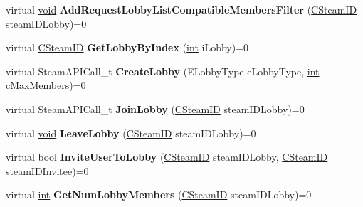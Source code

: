 \begin{DoxyCompactItemize}
\item 
\hypertarget{classISteamMatchmaking_aa2bcffc943566ee3c03b593cca4e0a22}{}virtual \hyperlink{SDL__audio_8h_a52835ae37c4bb905b903cbaf5d04b05f}{void} {\bfseries Add\+Request\+Lobby\+List\+Compatible\+Members\+Filter} (\hyperlink{classCSteamID}{C\+Steam\+I\+D} steam\+I\+D\+Lobby)=0\label{classISteamMatchmaking_aa2bcffc943566ee3c03b593cca4e0a22}

\item 
\hypertarget{classISteamMatchmaking_ae22f461db3ff301594791b0171ed3631}{}virtual \hyperlink{classCSteamID}{C\+Steam\+I\+D} {\bfseries Get\+Lobby\+By\+Index} (\hyperlink{SDL__thread_8h_a6a64f9be4433e4de6e2f2f548cf3c08e}{int} i\+Lobby)=0\label{classISteamMatchmaking_ae22f461db3ff301594791b0171ed3631}

\item 
\hypertarget{classISteamMatchmaking_a2c291ead7d67a5df0cceb77a88a6d0a9}{}virtual Steam\+A\+P\+I\+Call\+\_\+t {\bfseries Create\+Lobby} (E\+Lobby\+Type e\+Lobby\+Type, \hyperlink{SDL__thread_8h_a6a64f9be4433e4de6e2f2f548cf3c08e}{int} c\+Max\+Members)=0\label{classISteamMatchmaking_a2c291ead7d67a5df0cceb77a88a6d0a9}

\item 
\hypertarget{classISteamMatchmaking_a8dc517d730ddaa8311816244ceeac287}{}virtual Steam\+A\+P\+I\+Call\+\_\+t {\bfseries Join\+Lobby} (\hyperlink{classCSteamID}{C\+Steam\+I\+D} steam\+I\+D\+Lobby)=0\label{classISteamMatchmaking_a8dc517d730ddaa8311816244ceeac287}

\item 
\hypertarget{classISteamMatchmaking_a2a13b13352f6df85977dff74c4ddcd5d}{}virtual \hyperlink{SDL__audio_8h_a52835ae37c4bb905b903cbaf5d04b05f}{void} {\bfseries Leave\+Lobby} (\hyperlink{classCSteamID}{C\+Steam\+I\+D} steam\+I\+D\+Lobby)=0\label{classISteamMatchmaking_a2a13b13352f6df85977dff74c4ddcd5d}

\item 
\hypertarget{classISteamMatchmaking_a08c063280445302f22b028986f51cb24}{}virtual bool {\bfseries Invite\+User\+To\+Lobby} (\hyperlink{classCSteamID}{C\+Steam\+I\+D} steam\+I\+D\+Lobby, \hyperlink{classCSteamID}{C\+Steam\+I\+D} steam\+I\+D\+Invitee)=0\label{classISteamMatchmaking_a08c063280445302f22b028986f51cb24}

\item 
\hypertarget{classISteamMatchmaking_aac140a79a6024335b3779cfd68f6d925}{}virtual \hyperlink{SDL__thread_8h_a6a64f9be4433e4de6e2f2f548cf3c08e}{int} {\bfseries Get\+Num\+Lobby\+Members} (\hyperlink{classCSteamID}{C\+Steam\+I\+D} steam\+I\+D\+Lobby)=0\label{classISteamMatchmaking_aac140a79a6024335b3779cfd68f6d925}


\end{DoxyCompactItemize}
